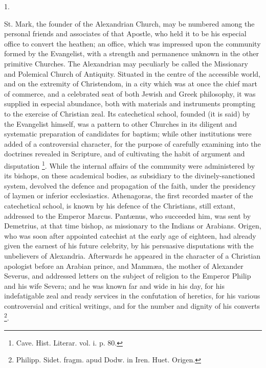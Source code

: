 1.

St. Mark, the founder of the Alexandrian Church, may be numbered
among the personal friends and associates of that Apostle, who held it
to be his especial office to convert the heathen; an office, which was
impressed upon the community formed by the Evangelist, with a strength
and permanence unknown in the other primitive Churches. The
Alexandrian may peculiarly be called the Missionary and Polemical
Church of Antiquity. Situated in the centre of the accessible world,
and on the extremity of Christendom, in a city which was at once the
chief mart of commerce, and a celebrated seat of both Jewish and Greek
philosophy, it was supplied in especial abundance, both with materials
and instruments prompting to the exercise of Christian zeal. Its
catechetical school, founded (it is said) by the Evangelist himself,
was a pattern to other Churches in its diligent and systematic
preparation of candidates for baptism; while other institutions were
added of a controversial character, for the purpose of carefully
examining into the doctrines revealed in Scripture, and of cultivating
the habit of argument and disputation \footnote{Cave. Hist. Literar. vol. i. p. 80.}. While the internal affairs of the community were administered
by its bishops, on these academical bodies, as subsidiary to the
divinely-sanctioned system, devolved the defence and propagation of
the faith, under the presidency of laymen or inferior
ecclesiastics. Athenagoras, the first recorded master of the
catechetical school, is known by his defence of the Christians, still
extant, addressed to the Emperor Marcus. Pantænus, who succeeded him,
was sent by Demetrius, at that time bishop, as missionary to the
Indians or Arabians. Origen, who was soon after appointed catechist at
the early age of eighteen, had already given the earnest of his future
celebrity, by his persuasive disputations with the unbelievers of
Alexandria. Afterwards he appeared in the character of a Christian
apologist before an Arabian prince, and Mammæa, the mother of
Alexander Severus, and addressed letters on the subject of religion to
the Emperor Philip and his wife Severa; and he was known far and wide
in his day, for his indefatigable zeal and ready services in the
confutation of heretics, for his various controversial and critical
writings, and for the number and dignity of his converts \footnote{Philipp. Sidet. fragm. apud Dodw. in Iren.
Huet. Origen.}.

